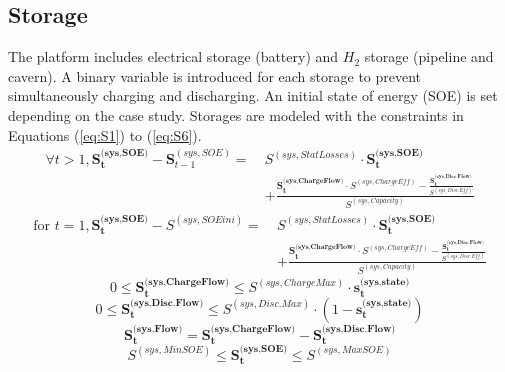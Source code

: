 \subsection{Storage} \label{Storage} \label{eq:S}
The platform includes electrical storage (battery) and $H_2$ storage (pipeline and cavern).
A binary variable is introduced for each storage to prevent simultaneously charging and discharging. An initial state of energy (SOE) is set depending on the case study. Storages are modeled with the constraints in Equations (\ref{eq:S1}) to (\ref{eq:S6}).
\begin{equation} \tag{S.1} \label{eq:S1}
    \begin{split}
        \forall t>1,\textbf{S}_\textbf{t}^{\textbf{(sys,SOE)}} - \textbf{S}_{t-1}^{(sys,SOE)} =~&  S^{(sys,StatLosses)} \cdot \textbf{S}_\textbf{t}^{\textbf{(sys,SOE)}} \\
                    & + \frac{\textbf{S}_\textbf{t}^{\textbf{(sys,ChargeFlow)}} \cdot S^{(sys,ChargeEff)} - \frac{\textbf{S}_\textbf{t}^{\textbf{(sys,Disc.Flow)}}}{S^{(sys,Disc.Eff)}}}{S^{(sys,Capacity)}}
    \end{split}
\end{equation}
\begin{equation} \tag{S.2} \label{eq:S2}
    \begin{split}
        \text{for } t=1,\textbf{S}_\textbf{t}^{\textbf{(sys,SOE)}} - S^{(sys,SOEini)} =~&  S^{(sys,StatLosses)} \cdot \textbf{S}_\textbf{t}^{\textbf{(sys,SOE)}} \\
                    & + \frac{\textbf{S}_\textbf{t}^{\textbf{(sys,ChargeFlow)}} \cdot S^{(sys,ChargeEff)} - \frac{\textbf{S}_\textbf{t}^{\textbf{(sys,Disc.Flow)}}}{S^{(sys,Disc.Eff)}}}{S^{(sys,Capacity)}}
    \end{split}
\end{equation}
\begin{equation} \tag{S.3} \label{eq:S3}
    0 \leq \textbf{S}_\textbf{t}^{\textbf{(sys,ChargeFlow)}} \leq S^{(sys,ChargeMax)} \cdot \textbf{s}_\textbf{t}^{\textbf{(sys,state)}}
\end{equation}
\begin{equation} \tag{S.4} \label{eq:S4}
    0 \leq \textbf{S}_\textbf{t}^{\textbf{(sys,Disc.Flow)}} \leq S^{(sys,Disc.Max)} \cdot (1-\textbf{s}_\textbf{t}^{\textbf{(sys,state)}})
\end{equation}
\begin{equation} \tag{S.5} \label{eq:S5}
    \textbf{S}_\textbf{t}^{\textbf{(sys,Flow)}} = \textbf{S}_\textbf{t}^{\textbf{(sys,ChargeFlow)}} - \textbf{S}_\textbf{t}^{\textbf{(sys,Disc.Flow)}}
\end{equation}
\begin{equation} \tag{S.6} \label{eq:S6}
    S^{(sys,MinSOE)} \leq \textbf{S}_\textbf{t}^{\textbf{(sys,SOE)}} \leq S^{(sys,MaxSOE)}
\end{equation}
